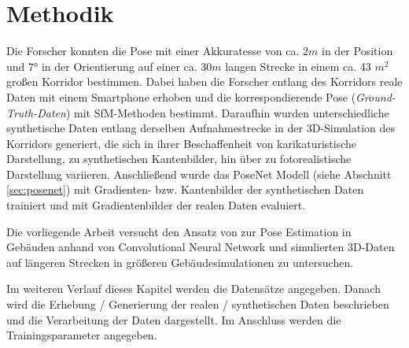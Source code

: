 
\section{Methodik}







Die Forscher \citet{acharyaBIMPoseNetIndoorCamera2019} konnten die Pose mit einer Akkuratesse von ca. $2m$ in der Position und 7° in der Orientierung auf einer ca. 30$m$ langen Strecke in einem ca. 43 $m^2$ großen Korridor bestimmen. Dabei haben die Forscher entlang des Korridors reale Daten mit einem Smartphone erhoben und die korrespondierende Pose (\textit{Ground-Truth-Daten}) mit SfM-Methoden bestimmt. Daraufhin wurden unterschiedliche synthetische Daten entlang derselben Aufnahmestrecke in der 3D-Simulation des Korridors generiert, die sich in ihrer Beschaffenheit von karikaturistische Darstellung, zu synthetischen Kantenbilder, hin über zu fotorealistische Darstellung variieren. Anschließend wurde das PoseNet Modell (siehe Abschnitt \ref{sec:posenet}) mit Gradienten- bzw. Kantenbilder der synthetischen Daten trainiert und mit Gradientenbilder der realen Daten evaluiert.



Die vorliegende Arbeit versucht den Ansatz von \citet{acharyaBIMPoseNetIndoorCamera2019} zur Pose Estimation in Gebäuden anhand von Convolutional Neural Network und simulierten 3D-Daten auf längeren Strecken in größeren Gebäudesimulationen zu untersuchen.


Im weiteren Verlauf dieses Kapitel werden die Datensätze angegeben. Danach wird die Erhebung / Generierung der realen / synthetischen Daten beschrieben und die Verarbeitung der Daten dargestellt. Im Anschluss werden die Trainingsparameter angegeben. 
